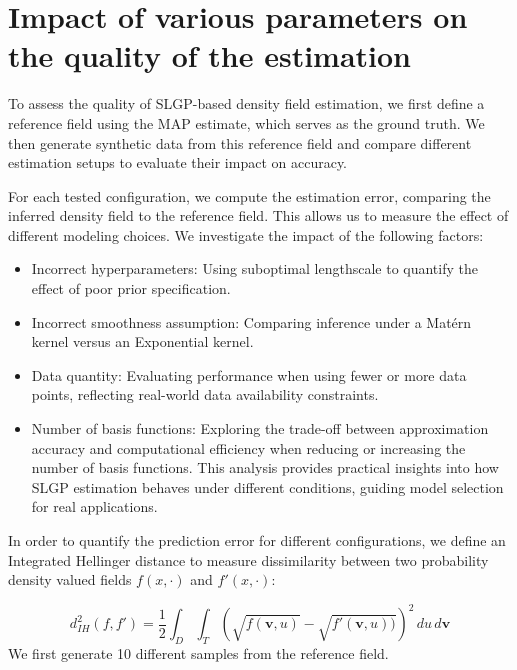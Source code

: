 \documentclass[
]{article}
\providecommand{\tightlist}{%
  \setlength{\itemsep}{0pt}\setlength{\parskip}{0pt}}
\begin{document}
\section{Impact of various parameters on the quality of the estimation}\label{impact-of-various-parameters-on-the-quality-of-the-estimation}

To assess the quality of SLGP-based density field estimation, we first define a reference field using the MAP estimate, which serves as the ground truth. We then generate synthetic data from this reference field and compare different estimation setups to evaluate their impact on accuracy.

For each tested configuration, we compute the estimation error, comparing the inferred density field to the reference field. This allows us to measure the effect of different modeling choices. We investigate the impact of the following factors:

\begin{itemize}
\tightlist
\item
  Incorrect hyperparameters: Using suboptimal lengthscale to quantify the effect of poor prior specification.
\item
  Incorrect smoothness assumption: Comparing inference under a Matérn kernel versus an Exponential kernel.
\item
  Data quantity: Evaluating performance when using fewer or more data points, reflecting real-world data availability constraints.
\item
  Number of basis functions: Exploring the trade-off between approximation accuracy and computational efficiency when reducing or increasing the number of basis functions.
  This analysis provides practical insights into how SLGP estimation behaves under different conditions, guiding model selection for real applications.
\end{itemize}

In order to quantify the prediction error for different configurations, we define an Integrated Hellinger distance to measure dissimilarity between two probability density valued fields \(f(x, \cdot)\) and \(f'(x, \cdot)\):

\[
d_{IH}^2(f , f' ) = \frac{1}{2}\int_D \int_T \left( \sqrt{f(\mathbf{v}, u)} - \sqrt{f'(\mathbf{v}, u))}  \right)^2 \,du \,d\mathbf{v}
\]
We first generate 10 different samples from the reference field.
\end{document}
